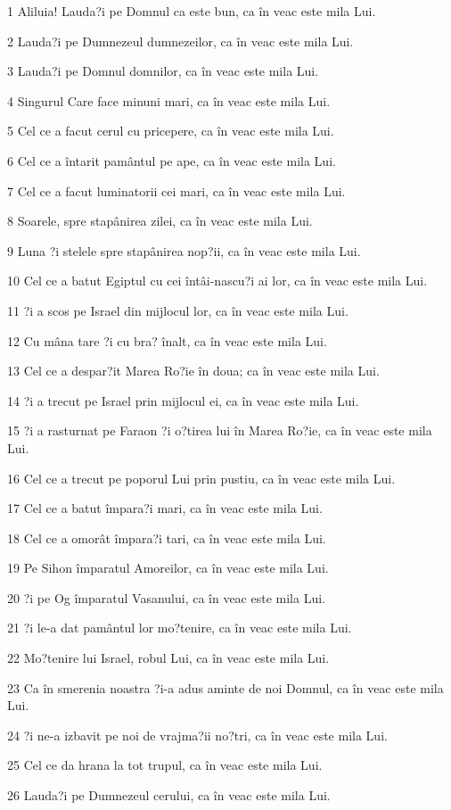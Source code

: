 \par 1 Aliluia! Lauda?i pe Domnul ca este bun, ca în veac este mila Lui.
\par 2 Lauda?i pe Dumnezeul dumnezeilor, ca în veac este mila Lui.
\par 3 Lauda?i pe Domnul domnilor, ca în veac este mila Lui.
\par 4 Singurul Care face minuni mari, ca în veac este mila Lui.
\par 5 Cel ce a facut cerul cu pricepere, ca în veac este mila Lui.
\par 6 Cel ce a întarit pamântul pe ape, ca în veac este mila Lui.
\par 7 Cel ce a facut luminatorii cei mari, ca în veac este mila Lui.
\par 8 Soarele, spre stapânirea zilei, ca în veac este mila Lui.
\par 9 Luna ?i stelele spre stapânirea nop?ii, ca în veac este mila Lui.
\par 10 Cel ce a batut Egiptul cu cei întâi-nascu?i ai lor, ca în veac este mila Lui.
\par 11 ?i a scos pe Israel din mijlocul lor, ca în veac este mila Lui.
\par 12 Cu mâna tare ?i cu bra? înalt, ca în veac este mila Lui.
\par 13 Cel ce a despar?it Marea Ro?ie în doua; ca în veac este mila Lui.
\par 14 ?i a trecut pe Israel prin mijlocul ei, ca în veac este mila Lui.
\par 15 ?i a rasturnat pe Faraon ?i o?tirea lui în Marea Ro?ie, ca în veac este mila Lui.
\par 16 Cel ce a trecut pe poporul Lui prin pustiu, ca în veac este mila Lui.
\par 17 Cel ce a batut împara?i mari, ca în veac este mila Lui.
\par 18 Cel ce a omorât împara?i tari, ca în veac este mila Lui.
\par 19 Pe Sihon împaratul Amoreilor, ca în veac este mila Lui.
\par 20 ?i pe Og împaratul Vasanului, ca în veac este mila Lui.
\par 21 ?i le-a dat pamântul lor mo?tenire, ca în veac este mila Lui.
\par 22 Mo?tenire lui Israel, robul Lui, ca în veac este mila Lui.
\par 23 Ca în smerenia noastra ?i-a adus aminte de noi Domnul, ca în veac este mila Lui.
\par 24 ?i ne-a izbavit pe noi de vrajma?ii no?tri, ca în veac este mila Lui.
\par 25 Cel ce da hrana la tot trupul, ca în veac este mila Lui.
\par 26 Lauda?i pe Dumnezeul cerului, ca în veac este mila Lui.


